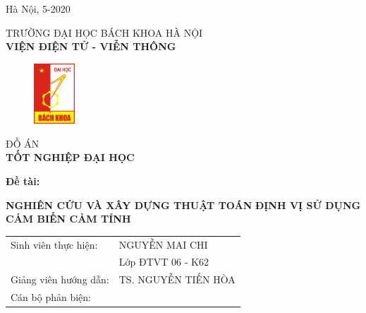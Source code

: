 \documentclass{article} %
\begin{document}
\begin{titlepage}
\begin{center}
\vspace{5.5cm}

\fontsize{14pt}{0pt}\selectfont Hà Nội, 5-2020    
\end{center}

\cleardoublepage
\thispagestyle{empty}
\begin{center}
\vspace{-0.5cm}\fontsize{13pt}{0pt}\selectfont TRƯỜNG ĐẠI HỌC BÁCH KHOA HÀ NỘI \\
\textbf{\fontsize{16pt}{0pt}\selectfont VIỆN ĐIỆN TỬ - VIỄN THÔNG}
\vspace{0.5cm}
\begin{figure}[H]
	\centering
	\includegraphics[height=2.26cm,width=1.53cm]{Images/logoBk.png}
\end{figure}
\vspace{1.5cm}
\fontsize{24pt}{0pt}\selectfont ĐỒ ÁN\\
\vspace{12pt}
\textbf{\fontsize{32pt}{6pt}\selectfont TỐT NGHIỆP ĐẠI HỌC}
\end{center}
\vspace{0.8cm}
\hspace{6pt}\textbf{\fontsize{14pt}{0pt}\selectfont Đề tài:}\\
\vspace{-20pt}
\begin{center}
    \textbf{\fontsize{20pt}{0pt}\selectfont NGHIÊN CỨU VÀ XÂY DỰNG THUẬT TOÁN}
    \textbf{\fontsize{20pt}{6pt}\selectfont ĐỊNH VỊ SỬ DỤNG CẢM BIẾN CẢM TÍNH}
    
\vspace{1.5cm}
\begin{tabular}{ l l }
\fontsize{14pt}{0pt}\selectfont Sinh viên thực hiện: & \fontsize{14pt}{0pt}\selectfont  NGUYỄN MAI CHI \vspace{6pt} \\ 
  & \fontsize{14pt}{0pt}\selectfont Lớp ĐTVT 06 - K62 \vspace{6pt}\\   
\fontsize{14pt}{0pt}\selectfont  Giảng viên hướng dẫn:\vspace{6pt} & \fontsize{14pt}{0pt}\selectfont TS. NGUYỄN TIẾN HÒA\\
Cán bộ phản biện: &
\end{tabular}


\end{center}
\end{titlepage}
\end{document}
